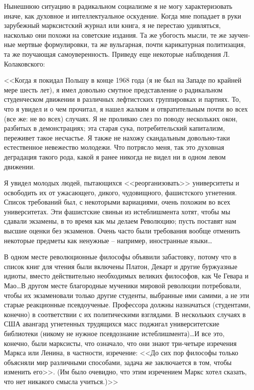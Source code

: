 \documentclass{book}
\begin{document}
Нынешнюю ситуацию в радикальном социализме я не могу характеризовать иначе, как духовное и интеллектуальное оску­дение. Когда мне попадает в руки зарубежный марксистский журнал или книга, я не перестаю удивляться, насколько они по­хожи на советские издания. Та же убогость мысли, те же заучен­ные мертвые формулировки, та же вульгарная, почти карика­турная политизация, та же поучающая самоуверенность. При­веду еще некоторые наблюдения Л. Колаковского:

<<Когда я покидал Польшу в конце 1968 года (я не был на Западе по крайней мере шесть лет), я имел довольно смутное представление о радикальном студенческом движении в различ­ных лефтистских группировках и партиях. То, что я увидел и о чем прочитал, я нашел жалким и отвратительным почти во всех (все же: не во всех) случаях. Я не проливаю слез по пово­ду нескольких окон, разбитых в демонстрациях; эта старая сука, потребительский капитализм, переживет такое несчастье. Я также не нахожу скандальным довольно-таки естественное невежество молодежи. Что потрясло меня, так это духовная деградация такого рода, какой я ранее никогда не видел ни в одном левом движении.

Я увидел молодых людей, пытающихся <<реорганизовать>> университеты и освободить их от ужасающего, дикого, чудо­вищного, фашистского угнетения. Список требований был, с некоторыми вариациями, очень похожим во всех университе­тах. Эти фашистские свиньи из истеблишмента хотят, чтобы мы сдавали экзамены, в то время как мы делаем Революцию; пусть поставят нам высшие оценки без экзаменов. Очень час­то были требования вообще отменить некоторые предметы как ненужные -- например, иностранные языки\ldots

В одном месте революционные философы объявили заба­стовку, потому что в список книг для чтения были включены Платон, Декарт и другие буржуазные идиоты, вместо действи­тельно необходимых великих философов, как Че Гевара и Мао\ldots В другом месте благородные мученики мировой революции по­требовали, чтобы их экзаменовали только другие студенты, вы­бранные ими самими, а не эти старые реакционные псевдо­ученые. Профессора должны назначаться (студентами, конеч­но) в соответствии с их политическими взглядами. В несколь­ких случаях в США авангард угнетенных трудящихся масс поджигал университетские библиотеки (никому не нужное псевдознание истеблишмента)\ldots И все это, конечно, были марк­систы, что означало, что они знают три-четыре изречения Маркса или Ленина, в частности, изречение: <<До сих пор философы только объясняли мир различными способами, задача же заклю­чается в том, чтобы изменить его>>. (Им было очевидно, что этим изречением Маркс хотел сказать, что нет никакого смысла учиться.)>>%
\end{document}
